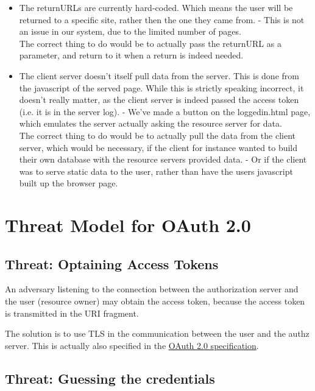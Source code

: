 \documentclass[12pt, a4paper]{article}
\begin{document}
\begin{itemize}
    \item
      The returnURLs are currently hard-coded.  Which means the user
      will be returned to a specific site, rather then the one they came
      from.
      - This is not an issue in our system, due to the limited number of
      pages. \\
      The correct thing to do would be to actually pass the returnURL as
      a parameter, and return to it when a return is indeed needed.

    \item
      The client server doesn't itself pull data from the server.
      This is done from the javascript of the served page.
      While this is strictly speaking incorrect, it doesn't really
      matter, as the client server is indeed passed the access token
      (i.e.  it is in the server log).
      - We've made a button on the loggedin.html page, which emulates
      the server actually asking the resource server for data. \\
      The correct thing to do would be to actually pull the data from
      the client server, which would be necessary, if the client for
      instance wanted to build their own database with the resource
      servers provided data.
      - Or if the client was to serve static data to the user, rather
      than have the users javascript built up the browser page.

  \end{itemize}

\section*{Threat Model for OAuth 2.0}

  \subsection*{Threat: Optaining Access Tokens}

  An adversary listening to the connection between the
  authorization server and the user (resource owner)
  may obtain the access token, because the access token is
  transmitted in the URI fragment.

  The solution is to use TLS in the communication between the user
  and the authz server.
  This is actually also specified in the
  \href{http://tools.ietf.org/html/rfc6749}{OAuth 2.0
  specification}.

  \subsection*{Threat: Guessing the credentials}
\end{document}
